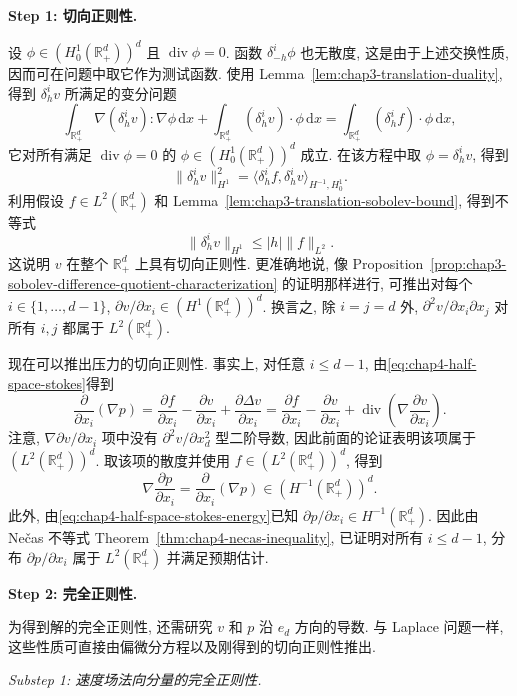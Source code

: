 \begin{Proof}
\textbf{Step 1: 切向正则性.}

设 $\phi\in(H_0^1(\mathbb R_+^d))^d$ 且 $\operatorname{div}\phi=0$. 函数 $\delta_{-h}^i\phi$ 也无散度, 这是由于上述交换性质, 因而可在问题中取它作为测试函数. 使用 Lemma~\ref{lem:chap3-translation-duality}, 得到 $\delta_h^iv$ 所满足的变分问题
\[
 \int_{\mathbb R_+^d}\nabla(\delta_h^iv):\nabla\phi\,\mathrm dx
 +\int_{\mathbb R_+^d}(\delta_h^iv)\cdot\phi\,\mathrm dx
 =\int_{\mathbb R_+^d}(\delta_h^if)\cdot\phi\,\mathrm dx,
\]
它对所有满足 $\operatorname{div}\phi=0$ 的 $\phi\in(H_0^1(\mathbb R_+^d))^d$ 成立. 在该方程中取 $\phi=\delta_h^iv$, 得到
\[
 \|\delta_h^iv\|_{H^1}^2
 =\langle\delta_h^if,\delta_h^iv\rangle_{H^{-1},H_0^1}.
\]
利用假设 $f\in L^2(\mathbb R_+^d)$ 和 Lemma~\ref{lem:chap3-translation-sobolev-bound}, 得到不等式
\[
 \|\delta_h^iv\|_{H^1}\leq|h|\|f\|_{L^2}.
\]
这说明 $v$ 在整个 $\mathbb R_+^d$ 上具有切向正则性. 更准确地说, 像 Proposition~\ref{prop:chap3-sobolev-difference-quotient-characterization} 的证明那样进行, 可推出对每个 $i\in\{1,\ldots,d-1\}$, $\partial v/\partial x_i\in(H^1(\mathbb R_+^d))^d$. 换言之, 除 $i=j=d$ 外, $\partial^2v/\partial x_i\partial x_j$ 对所有 $i,j$ 都属于 $L^2(\mathbb R_+^d)$.

现在可以推出压力的切向正则性. 事实上, 对任意 $i\leq d-1$, 由\eqref{eq:chap4-half-space-stokes}得到
\[
 \frac{\partial}{\partial x_i}(\nabla p)
 =\frac{\partial f}{\partial x_i}-\frac{\partial v}{\partial x_i}
 +\frac{\partial\Delta v}{\partial x_i}
 =\frac{\partial f}{\partial x_i}-\frac{\partial v}{\partial x_i}
 +\operatorname{div}\left(\nabla\frac{\partial v}{\partial x_i}\right).
\]
注意, $\nabla\partial v/\partial x_i$ 项中没有 $\partial^2v/\partial x_d^2$ 型二阶导数, 因此前面的论证表明该项属于 $(L^2(\mathbb R_+^d))^d$. 取该项的散度并使用 $f\in(L^2(\mathbb R_+^d))^d$, 得到
\[
 \nabla\frac{\partial p}{\partial x_i}
 =\frac{\partial}{\partial x_i}(\nabla p)
 \in(H^{-1}(\mathbb R_+^d))^d.
\]
此外, 由\eqref{eq:chap4-half-space-stokes-energy}已知 $\partial p/\partial x_i\in H^{-1}(\mathbb R_+^d)$. 因此由 Nečas 不等式 Theorem~\ref{thm:chap4-necas-inequality}, 已证明对所有 $i\leq d-1$, 分布 $\partial p/\partial x_i$ 属于 $L^2(\mathbb R_+^d)$ 并满足预期估计.

\textbf{Step 2: 完全正则性.}

为得到解的完全正则性, 还需研究 $v$ 和 $p$ 沿 $e_d$ 方向的导数. 与 Laplace 问题一样, 这些性质可直接由偏微分方程以及刚得到的切向正则性推出.

\emph{Substep 1: 速度场法向分量的完全正则性.}


\end{Proof}

